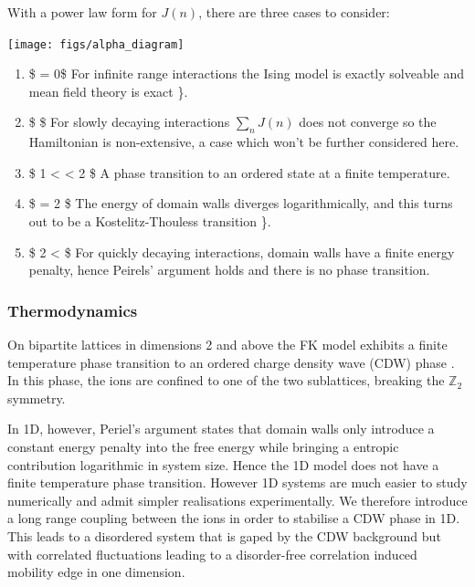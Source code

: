 With a power law form for \(J(n)\), there are three cases to consider:

\begin{center}
    \texttt{[image: figs/alpha\_diagram]}
\end{center}

\begin{enumerate}
\def\labelenumi{\arabic{enumi}.}
\tightlist
\item
  \$ \alpha = 0\$ For infinite range interactions the Ising model is exactly solveable and mean field theory is exact \textcite{lipkinValidityManybodyApproximation1965}\}.
\item
  \$ \alpha {}\$ For slowly decaying interactions \(\sum_n J(n)\) does not converge so the Hamiltonian is non-extensive, a case which won't be further considered here.
\item
  \$ 1 \textless{} \alpha \textless{} 2 \$ A phase transition to an ordered state at a finite temperature.
\item
  \$ \alpha = 2 \$ The energy of domain walls diverges logarithmically, and this turns out to be a Kostelitz-Thouless transition \textcite{thoulessLongRangeOrderOneDimensional1969}\}.
\item
  \$ 2 \textless{} \alpha \$ For quickly decaying interactions, domain walls have a finite energy penalty, hence Peirels' argument holds and there is no phase transition.
\end{enumerate}

\hypertarget{thermodynamics}{%
\subsubsection{Thermodynamics}\label{thermodynamics}}

On bipartite lattices in dimensions 2 and above the FK model exhibits a finite temperature phase transition to an ordered charge density wave (CDW) phase \textcite{maskaThermodynamicsTwodimensionalFalicovKimball2006}. In this phase, the ions are confined to one of the two sublattices, breaking the \(\mathbb{Z}_2\) symmetry.

In 1D, however, Periel's argument \autocite{peierlsIsingModelFerromagnetism1936,kennedyItinerantElectronModel1986} states that domain walls only introduce a constant energy penalty into the free energy while bringing a entropic contribution logarithmic in system size. Hence the 1D model does not have a finite temperature phase transition. However 1D systems are much easier to study numerically and admit simpler realisations experimentally. We therefore introduce a long range coupling between the ions in order to stabilise a CDW phase in 1D. This leads to a disordered system that is gaped by the CDW background but with correlated fluctuations leading to a disorder-free correlation induced mobility edge in one dimension.

